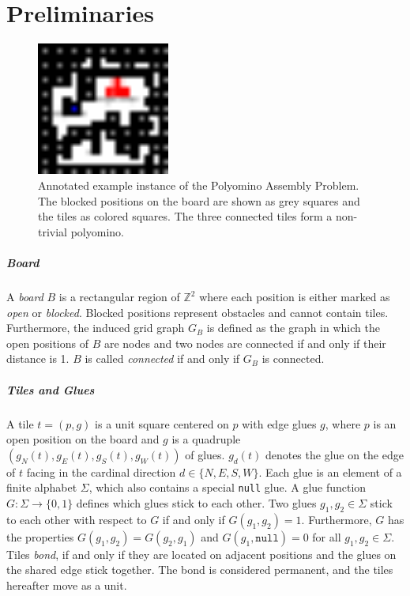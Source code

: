 \chapter{Preliminaries}

\begin{figure}
\centering
\includegraphics[width=0.39\textwidth]{figures/example_boards/preliminary.pdf}
\caption[Example instance of the Polyomino Assembly Problem]{Annotated example instance of the Polyomino Assembly Problem. The blocked positions on the board are shown as grey squares and the tiles as colored squares. The three connected tiles form a non-trivial polyomino.}
\label{fig:example_instance}
\end{figure}

\paragraph{Board} A \emph{board} $B$ is a rectangular region of $\mathbb{Z}^2$ where each position is either marked as \emph{open} or \emph{blocked}. Blocked positions represent obstacles and cannot contain tiles. Furthermore, the induced grid graph $G_{B}$ is defined as the graph in which the open positions of $B$ are nodes and two nodes are connected if and only if their distance is 1. $B$ is called \emph{connected} if and only if $G_{B}$ is connected.

\paragraph{Tiles and Glues} A tile $t= (p, g)$ is a unit square centered on $p$ with edge glues $g$, where $p$ is an open position on the board and $g$ is a quadruple $(g_{N}(t), g_{E}(t), g_{S}(t), g_{W}(t))$ of glues. $g_{d}(t)$ denotes the glue on the edge of $t$ facing in the cardinal direction $d \in \{N,E,S,W\}$. Each glue is an element of a finite alphabet $\Sigma$, which also contains a special \texttt{null} glue. A glue function $G \colon \Sigma \to \{0, 1\}$ defines which glues stick to each other. Two glues $g_{1}, g_{2} \in \Sigma$ stick to each other with respect to $G$ if and only if $G(g_{1}, g_{2}) = 1$. Furthermore, $G$ has the properties $G(g_{1}, g_{2}) = G(g_{2}, g_{1})$ and $G({g_{1}, \texttt{null}}) = 0$ for all $g_{1}, g_{2} \in \Sigma$. Tiles \emph{bond}, if and only if they are located on adjacent positions and the glues on the shared edge stick together. The bond is considered permanent, and the tiles hereafter move as a unit.

